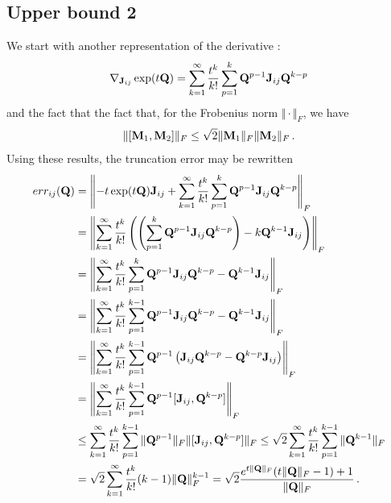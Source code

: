 \documentclass[12pt]{article} %
\begin{document}
\subsection{Upper bound 2}

We start with another representation of the derivative \citep{al2009computing}:
\begin{align*}
	\nabla_{\mathbf{J}_{ij}} \exp(t\mathbf{Q}) = \sum_{k=1}^\infty \frac{t^k}{k!} \sum_{p=1}^k \mathbf{Q}^{p-1} \mathbf{J}_{ij} \mathbf{Q}^{k-p} 
\end{align*}
and the fact that
the fact that, for the Frobenius norm $\Vert \cdot \Vert_F$, we have \citep{wu2010short}
\begin{align*}
	\Vert [\mathbf{M}_1,\mathbf{M}_2] \Vert_F \leq \sqrt{2} \Vert \mathbf{M}_1 \Vert_F \Vert \mathbf{M}_2\Vert_F \, .
\end{align*}
Using these results, the truncation error may be rewritten
\begin{align*}
err_{ij}(\mathbf{Q})  &=\left\Vert - t\exp(t\mathbf{Q}) \mathbf{J}_{ij}  +  \sum_{k=1}^\infty \frac{t^k}{k!} \sum_{p=1}^k \mathbf{Q}^{p-1} \mathbf{J}_{ij} \mathbf{Q}^{k-p}\right\Vert_F \\
&= \left\Vert \sum_{k=1}^\infty \frac{t^k}{k!} \left( \left( \sum_{p=1}^k \mathbf{Q}^{p-1} \mathbf{J}_{ij} \mathbf{Q}^{k-p} \right) - k \mathbf{Q}^{k-1} \mathbf{J}_{ij} \right)  \right\Vert_F\\
&= \left\Vert \sum_{k=1}^\infty \frac{t^k}{k!} \sum_{p=1}^k \mathbf{Q}^{p-1} \mathbf{J}_{ij} \mathbf{Q}^{k-p}  -  \mathbf{Q}^{k-1} \mathbf{J}_{ij} \right\Vert_F \\
&=\left\Vert  \sum_{k=1}^\infty \frac{t^k}{k!} \sum_{p=1}^{k-1} \mathbf{Q}^{p-1} \mathbf{J}_{ij} \mathbf{Q}^{k-p}  -  \mathbf{Q}^{k-1} \mathbf{J}_{ij}\right\Vert_F \\
&=\left\Vert  \sum_{k=1}^\infty \frac{t^k}{k!} \sum_{p=1}^{k-1} \mathbf{Q}^{p-1}\left( \mathbf{J}_{ij} \mathbf{Q}^{k-p}  -  \mathbf{Q}^{k-p} \mathbf{J}_{ij} \right)\right\Vert_F \\
&= \left\Vert  \sum_{k=1}^\infty \frac{t^k}{k!} \sum_{p=1}^{k-1} \mathbf{Q}^{p-1}[\mathbf{J}_{ij}, \mathbf{Q}^{k-p}] \right\Vert_F  \\
&\leq  \sum_{k=1}^\infty \frac{t^k}{k!} \sum_{p=1}^{k-1} \Vert \mathbf{Q}^{p-1} \Vert_F \Vert[\mathbf{J}_{ij}, \mathbf{Q}^{k-p}]\Vert_F 
\leq \sqrt{2}  \sum_{k=1}^\infty \frac{t^k}{k!} \sum_{p=1}^{k-1} \Vert \mathbf{Q}^{k-1} \Vert_F  \\
&= \sqrt{2}  \sum_{k=1}^\infty \frac{t^k}{k!} (k-1) \Vert \mathbf{Q} \Vert_F^{k-1} = \sqrt{2} \frac{e^{t\Vert \mathbf{Q}\Vert_F}(t\Vert\mathbf{Q}\Vert_F - 1) + 1}{\Vert \mathbf{Q} \Vert_F} \, .
\end{align*}
\end{document}
